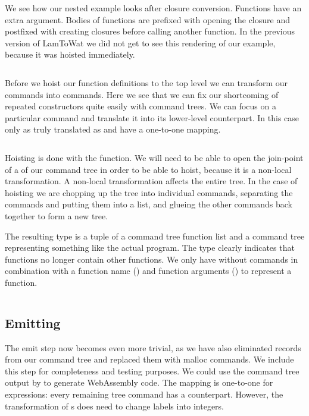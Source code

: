We see how our nested example  looks after closure conversion. Functions have an extra  argument. Bodies of functions are prefixed with opening the closure and postfixed with creating closures before calling another function. In the previous version of LamToWat we did not get to see this rendering of our example, because it was hoisted immediately.

\begin{lstlisting}[language=Python]
\end{lstlisting}

Before we hoist our function definitions to the top level we can transform our  commands into  commands. Here we see that we can fix our shortcoming of repeated constructors quite easily with command trees. We can focus on a particular command and translate it into its lower-level counterpart. In this case only  as truly translated as  and  have a one-to-one mapping.

\begin{lstlisting}[language=Haskell]
\end{lstlisting}

Hoisting is done with the  function. We will need to be able to open the join-point of a  of our command tree in order to be able to hoist, because it is a non-local transformation. A non-local transformation affects the entire tree. In the case of hoisting we are chopping up the tree into individual commands, separating the  commands and putting them into a list, and glueing the other commands back together to form a new tree.

The resulting type is a tuple of a command tree function list and a command tree representing something like the actual program. The type clearly indicates that functions no longer contain other functions. We only have  without  commands in combination with a function name () and function arguments (\icode{[String]}) to represent a function.

\begin{lstlisting}[language=Haskell]
\end{lstlisting}

\subsection{\label{subsection:emit2}Emitting}
The emit step now becomes even more trivial, as we have also eliminated records from our command tree and replaced them with malloc commands. We include this step for completeness and testing purposes. We could use the command tree output by  to generate WebAssembly code. The mapping is one-to-one for expressions: every remaining tree command has a  counterpart. However, the transformation of s does need to change labels into integers.

